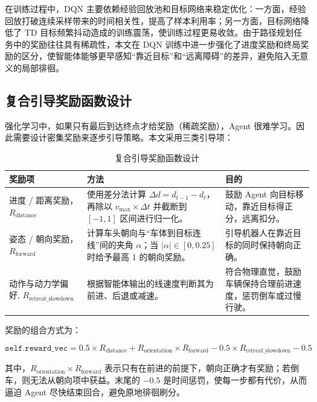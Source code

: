 在训练过程中，DQN 主要依赖经验回放池和目标网络来稳定优化：一方面，经验回放打破连续采样带来的时间相关性，提高了样本利用率；另一方面，目标网络降低了 TD 目标频繁抖动造成的训练震荡，使训练过程更易收敛。\cite{zhou2018deep}由于路径规划任务中的奖励往往具有稀疏性，本文在 DQN 训练中进一步强化了进度奖励和终局奖励的区分，使智能体能够更早感知“靠近目标”和“远离障碍”的差异，避免陷入无意义的局部徘徊。

\subsection{复合引导奖励函数设计}
强化学习中，如果只有最后到达终点才给奖励（稀疏奖励），Agent 很难学习。因此需要设计密集奖励来逐步引导策略。本文采用三类引导项：

\begin{table}[H]
    \centering
    \caption{复合引导奖励函数设计}
    \label{tab:reward_design}
    \begin{tabular}{p{}p{}p{}}
        \toprule
        \textbf{奖励项} & \textbf{方法} & \textbf{目的} \\
        \midrule
        进度 / 距离奖励，$R_{\mathrm{distance}}$  & 使用差分法计算 $\Delta d = d_{t-1} - d_t$，再除以 $v_{\max} \times \Delta t$ 并截断到 $[-1,1]$ 区间进行归一化。 & 鼓励 Agent 向目标移动，靠近目标得正分，远离扣分。 \\
        姿态 / 朝向奖励，$R_{\mathrm{forward}}$  & 计算车头朝向与“车体到目标连线”间的夹角 $\alpha$；当 $|\alpha|\in[0,0.25]$ 时给予最高 1 的朝向奖励。 & 引导机器人在靠近目标的同时保持朝向正确。 \\
        动作与动力学偏好, $R_{\mathrm{retreat\_slowdown}}$ & 根据智能体输出的线速度判断其为前进、后退或减速。 & 符合物理直觉，鼓励车辆保持合理前进速度，惩罚倒车或过慢行驶。 \\
        \bottomrule
    \end{tabular}
\end{table}

奖励的组合方式为：

\begin{equation}
    \texttt{self.reward\_vec} = 0.5 \times R_{\mathrm{distance}} + R_{\mathrm{orientation}} \times R_{\mathrm{forward}} - 0.5 \times R_{\mathrm{retreat\_slowdown}} - 0.5
\end{equation}

其中，$R_{\mathrm{orientation}} \times R_{\mathrm{forward}}$ 表示只有在前进的前提下，朝向正确才有奖励；若倒车，则无法从朝向项中获益。末尾的 $-0.5$ 是时间惩罚，使每一步都有代价，从而逼迫 Agent 尽快结束回合，避免原地徘徊刷分。\cite{DWA}

